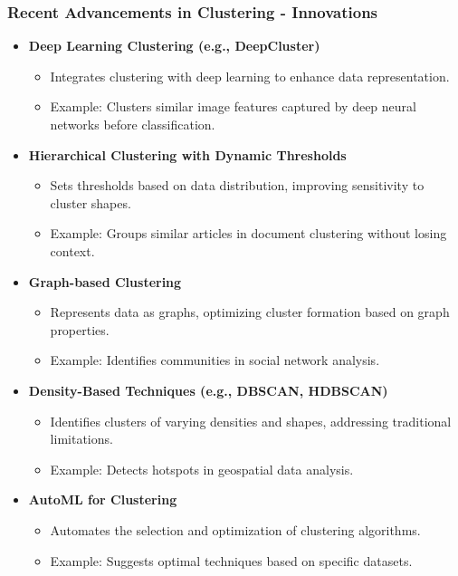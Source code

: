 \documentclass[aspectratio=169]{beamer}
\begin{document}
\begin{frame}[fragile]
    \frametitle{Recent Advancements in Clustering - Innovations}
    \begin{itemize}
        \item \textbf{Deep Learning Clustering (e.g., DeepCluster)}
            \begin{itemize}
                \item Integrates clustering with deep learning to enhance data representation.
                \item Example: Clusters similar image features captured by deep neural networks before classification.
            \end{itemize}
        
        \item \textbf{Hierarchical Clustering with Dynamic Thresholds}
            \begin{itemize}
                \item Sets thresholds based on data distribution, improving sensitivity to cluster shapes.
                \item Example: Groups similar articles in document clustering without losing context.
            \end{itemize}
        
        \item \textbf{Graph-based Clustering}
            \begin{itemize}
                \item Represents data as graphs, optimizing cluster formation based on graph properties.
                \item Example: Identifies communities in social network analysis.
            \end{itemize}
        
        \item \textbf{Density-Based Techniques (e.g., DBSCAN, HDBSCAN)}
            \begin{itemize}
                \item Identifies clusters of varying densities and shapes, addressing traditional limitations.
                \item Example: Detects hotspots in geospatial data analysis.
            \end{itemize}
        
        \item \textbf{AutoML for Clustering}
            \begin{itemize}
                \item Automates the selection and optimization of clustering algorithms.
                \item Example: Suggests optimal techniques based on specific datasets.
            \end{itemize}
    \end{itemize}
\end{frame}
\end{document}
